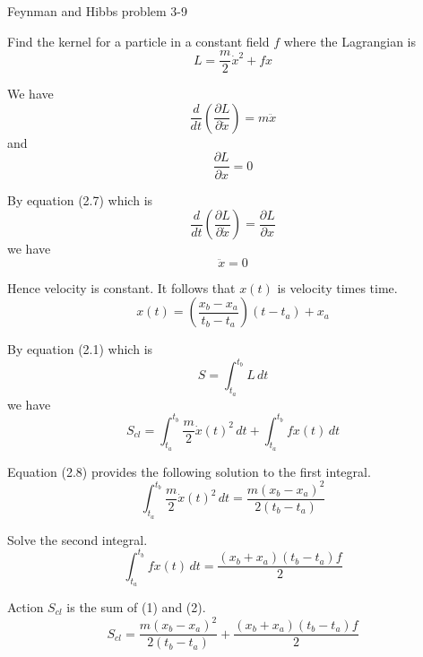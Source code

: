 \documentclass[12pt]{article}
\begin{document}
Feynman and Hibbs problem 3-9


\bigskip
Find the kernel for a particle in a constant field $f$
where the Lagrangian is
\begin{equation*}
L=\frac{m}{2}\dot x^2+fx
\end{equation*}


We have
\begin{equation*}
\frac{d}{dt}\left(\frac{\partial L}{\partial\dot x}\right)=m\ddot x
\end{equation*}
and
\begin{equation*}
\frac{\partial L}{\partial x}=0
\end{equation*}

\noindent
By equation (2.7) which is
\begin{equation*}
\frac{d}{dt}\left(\frac{\partial L}{\partial\dot x}\right)=\frac{\partial L}{\partial x}
\end{equation*}
we have
\begin{equation*}
\ddot x=0
\end{equation*}

\noindent
Hence velocity is constant. It follows that $x(t)$ is velocity times time.
\begin{equation*}
x(t)=\left(\frac{x_b-x_a}{t_b-t_a}\right)(t-t_a)+x_a
\end{equation*}

\noindent
By equation (2.1) which is
\begin{equation*}
S=\int_{t_a}^{t_b} L\,dt
\end{equation*}
we have
\begin{equation*}
S_{cl}=\int_{t_a}^{t_b}\frac{m}{2}\dot x(t)^2\,dt
+\int_{t_a}^{t_b}fx(t)\,dt
\end{equation*}


Equation (2.8) provides the following solution to the first integral.
\begin{equation*}
\int_{t_a}^{t_b}\frac{m}{2}\dot x(t)^2\,dt
=\frac{m(x_b-x_a)^2}{2(t_b-t_a)}
\tag{1}
\end{equation*}


Solve the second integral.
\begin{equation*}
\int_{t_a}^{t_b}fx(t)\,dt=\frac{(x_b+x_a)(t_b-t_a)f}{2}
\tag{2}
\end{equation*}


Action $S_{cl}$ is the sum of (1) and (2).
\begin{equation*}
S_{cl}=\frac{m(x_b-x_a)^2}{2(t_b-t_a)}+\frac{(x_b+x_a)(t_b-t_a)f}{2}
\end{equation*}
\end{document}
